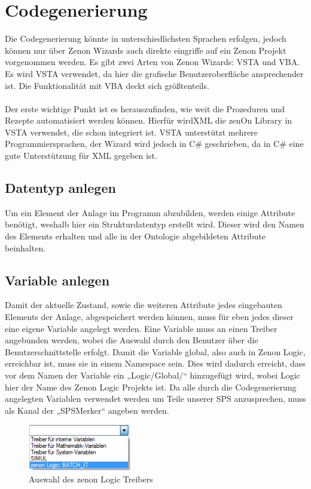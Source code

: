 \section{Codegenerierung}

Die Codegenerierung könnte in unterschiedlichsten Sprachen erfolgen, jedoch können nur über Zenon Wizards auch direkte eingriffe auf ein Zenon Projekt vorgenommen werden. Es gibt zwei Arten von Zenon Wizards: \ac{VSTA} und \ac{VBA}. Es wird \ac{VSTA} verwendet, da hier die grafische Benutzeroberfläche ansprechender ist. Die Funktionalität mit \ac{VBA} deckt sich größtenteils.\\\\
Der erste wichtige Punkt ist es herauszufinden, wie weit die Prozeduren und Rezepte automatisiert werden können. Hierfür wird\ac{XML}  die zenOn Library in \ac{VSTA} verwendet, die schon integriert ist. \ac{VSTA} unterstützt mehrere Programmiersprachen, der Wizard wird jedoch in C\# geschrieben, da in C\# eine gute Unterstützung für \ac{XML} gegeben ist.\\

\subsection{Datentyp anlegen}
Um ein Element der Anlage im Programm abzubilden, werden einige Attribute benötigt, weshalb hier ein Strukturdatentyp erstellt wird. Dieser wird den Namen des Elements erhalten und alle in der Ontologie abgebildeten Attribute beinhalten.



\subsection{Variable anlegen}
Damit der aktuelle Zustand, sowie die weiteren Attribute jedes eingebauten Elements der Anlage, abgespeichert werden können, muss für eben jedes dieser eine eigene Variable angelegt werden. Eine Variable muss an einen Treiber angebunden werden, wobei die Auswahl durch den Benutzer über die Benutzerschnittstelle erfolgt. Damit die Variable global, also auch in Zenon Logic, erreichbar ist, muss sie in einem Namespace sein. Dies wird dadurch erreicht, dass vor dem Namen der Variable ein „Logic/Global/“ hinzugefügt wird, wobei Logic hier der Name des Zenon Logic Projekts ist. Da alle durch die Codegenerierung angelegten Variablen verwendet werden um Teile unserer \ac{SPS} anzusprechen, muss als Kanal der „SPSMerker“ angeben werden.
\begin{figure}[hbt!]
  \centering
  \includegraphics[width=0.4\textwidth]{graphics/implementation/treiberauswahl}
  \caption{Auswahl des zenon Logic Treibers}
\end{figure}

